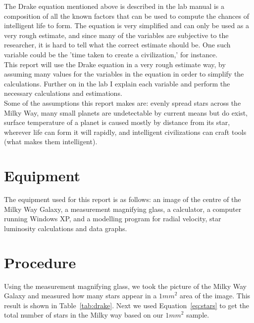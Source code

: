 \documentclass{article}
\begin{document}
The Drake equation mentioned above is described in the lab manual is a composition of all the known factors that can be used to compute the chances of intelligent life to form.  The equation is very simplified and can only be used as a very rough estimate, and since many of the variables are subjective to the researcher, it is hard to tell what the correct estimate should be.  One such variable could be the 'time taken to create a civilization,' for instance. \\

This report will use the Drake equation in a very rough estimate way, by assuming many values for the variables in the equation in order to simplify the calculations.  Further on in the lab I explain each variable and perform the necessary calculations and estimations.\\

Some of the assumptions this report makes are: evenly spread stars across the Milky Way, many small planets are undetectable by current means but do exist, surface temperature of a planet is caused mostly by distance from its star, wherever life can form it will rapidly, and intelligent civilizations can craft tools (what makes them intelligent).\\


\section{Equipment}

The equipment used for this report is as follows: an image of the centre of the Milky Way Galaxy, a measurement magnifying glass, a calculator, a computer running Windows XP, and a modelling program for radial velocity, star luminosity calculations and data graphs.


\section{Procedure}
\label{sec:proc}

Using the measurement magnifying glass, we took the picture of the Milky Way Galaxy and measured how many stars appear in a ${1mm}^{2}$ area of the image.  This result is shown in Table~\ref{tab:drake}.  Next we used Equation~\ref{eq:stars} to get the total number of stars in the Milky way based on our ${1mm}^{2}$ sample.\\
\end{document}
